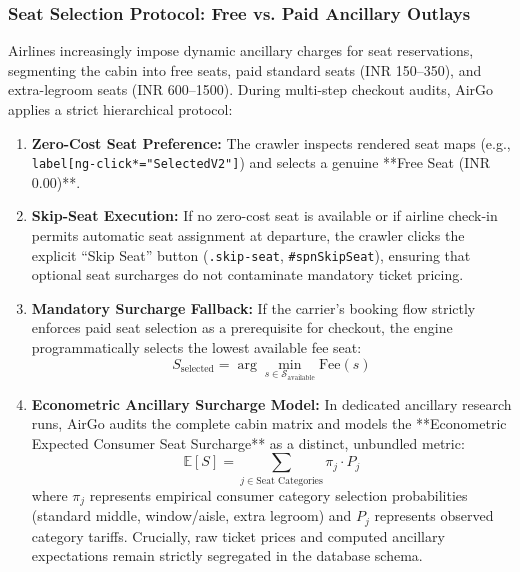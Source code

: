 \documentclass[11pt,a4paper]{article}
\begin{document}
\subsubsection{Seat Selection Protocol: Free vs. Paid Ancillary Outlays}
Airlines increasingly impose dynamic ancillary charges for seat reservations, segmenting the cabin into free seats, paid standard seats (INR 150--350), and extra-legroom seats (INR 600--1500). During multi-step checkout audits, AirGo applies a strict hierarchical protocol:
\begin{enumerate}
    \item \textbf{Zero-Cost Seat Preference:} The crawler inspects rendered seat maps (e.g., \texttt{label[ng-click*="SelectedV2"]}) and selects a genuine **Free Seat (INR 0.00)**.
    \item \textbf{Skip-Seat Execution:} If no zero-cost seat is available or if airline check-in permits automatic seat assignment at departure, the crawler clicks the explicit ``Skip Seat'' button (\texttt{.skip-seat}, \texttt{\#spnSkipSeat}), ensuring that optional seat surcharges do not contaminate mandatory ticket pricing.
    \item \textbf{Mandatory Surcharge Fallback:} If the carrier's booking flow strictly enforces paid seat selection as a prerequisite for checkout, the engine programmatically selects the lowest available fee seat:
    \begin{equation}
    S_{\text{selected}} = \arg\min_{s \in \mathcal{S}_{\text{available}}} \text{Fee}(s)
    \end{equation}
    \item \textbf{Econometric Ancillary Surcharge Model:} In dedicated ancillary research runs, AirGo audits the complete cabin matrix and models the **Econometric Expected Consumer Seat Surcharge** as a distinct, unbundled metric:
    \begin{equation}
    \label{eq:expected_seat_surcharge}
    \mathbb{E}[S] = \sum_{j \in \text{Seat Categories}} \pi_j \cdot P_j
    \end{equation}
    where $\pi_j$ represents empirical consumer category selection probabilities (standard middle, window/aisle, extra legroom) and $P_j$ represents observed category tariffs. Crucially, raw ticket prices and computed ancillary expectations remain strictly segregated in the database schema.
\end{enumerate}
\end{document}
